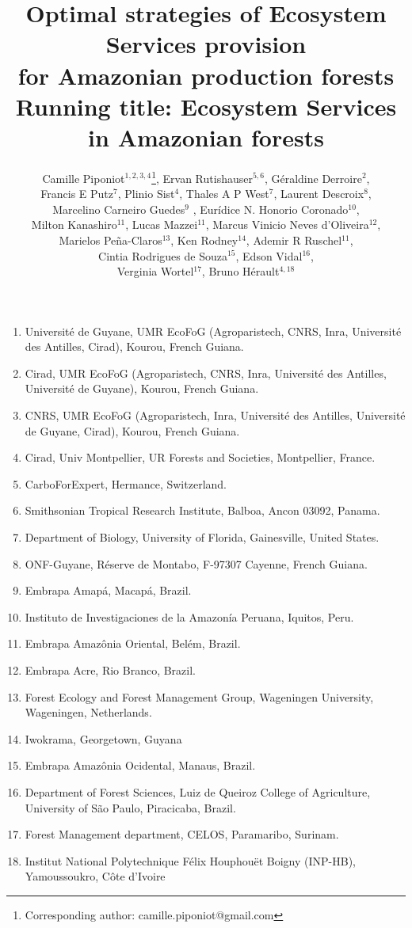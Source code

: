 \documentclass[12pt]{article}
\title{Optimal strategies of Ecosystem Services provision \\for Amazonian production forests\\ {\small Running title: Ecosystem Services in Amazonian forests}}
\author{Camille Piponiot$^{1,2,3,4}$\footnote{Corresponding author: camille.piponiot@gmail.com}, Ervan Rutishauser$^{5,6}$, Géraldine Derroire$^{2}$, \\Francis E Putz$^{7}$, Plinio Sist$^{4}$, Thales A P West$^{7}$, Laurent Descroix$^{8}$,\\ Marcelino Carneiro Guedes$^{9}$ , Eur\'idice N. Honorio Coronado$^{10}$, \\Milton Kanashiro$^{11}$, Lucas Mazzei$^{11}$, Marcus Vinicio Neves d’Oliveira$^{12}$,\\ Marielos Peña-Claros$^{13}$, Ken Rodney$^{14}$, Ademir R Ruschel$^{11}$,\\ Cintia Rodrigues de Souza$^{15}$, Edson Vidal$^{16}$, \\Verginia Wortel$^{17}$, Bruno Hérault$^{4,18}$}
\date{}
\begin{document}
\maketitle 

\begin{enumerate}
\item  Université  de  Guyane,  UMR  EcoFoG  (Agroparistech,  CNRS,  Inra,  Université  des  Antilles,  Cirad), Kourou, French Guiana.
\item Cirad,  UMR  EcoFoG  (Agroparistech,  CNRS,  Inra,  Université  des  Antilles,  Université  de  Guyane), Kourou, French Guiana.
\item CNRS,  UMR  EcoFoG  (Agroparistech,  Inra,  Université des  Antilles,  Université  de  Guyane,  Cirad), Kourou, French Guiana.
\item Cirad, Univ Montpellier, UR Forests and Societies, Montpellier, France.
\item CarboForExpert, Hermance, Switzerland.
\item Smithsonian Tropical Research Institute, Balboa, Ancon 03092, Panama.
\item Department of Biology, University of Florida, Gainesville, United States.
\item ONF-Guyane, Réserve de Montabo, F-97307 Cayenne, French Guiana.
\item Embrapa Amapá, Macapá, Brazil. 
\item Instituto de Investigaciones de la Amazonía Peruana, Iquitos, Peru.
\item Embrapa Amazônia Oriental, Belém, Brazil.
\item Embrapa Acre, Rio Branco, Brazil.
\item Forest Ecology and Forest Management Group, Wageningen University, Wageningen, Netherlands.
\item Iwokrama, Georgetown, Guyana
\item Embrapa Amazônia Ocidental, Manaus, Brazil.
\item Department of Forest Sciences, Luiz de Queiroz College of Agriculture, University of São Paulo, Piracicaba, Brazil.
\item Forest Management department, CELOS, Paramaribo, Surinam.
\item Institut National Polytechnique Félix Houphouët Boigny (INP-HB), Yamoussoukro, Côte d’Ivoire

\end{enumerate}
\end{document}
